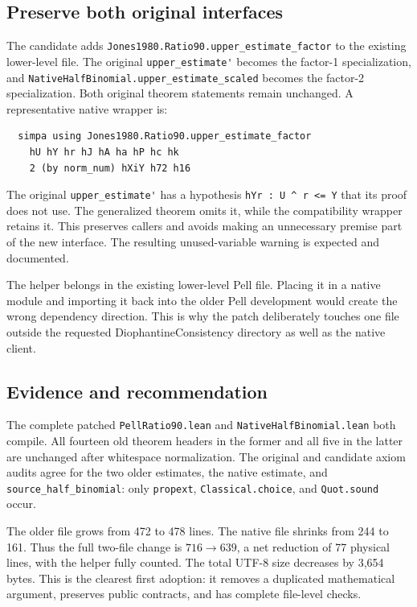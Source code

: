 \documentclass[11pt]{article}
\theoremstyle{remark}\newtheorem{remark}[proposition]{Remark}
\newcommand{\code}[1]{\nolinkurl{#1}}
\begin{document}
\subsection{Preserve both original interfaces}

The candidate adds \code{Jones1980.Ratio90.upper_estimate_factor} to the existing lower-level file. The original \code{upper_estimate'} becomes the factor-1 specialization, and \code{NativeHalfBinomial.upper_estimate_scaled} becomes the factor-2 specialization. Both original theorem statements remain unchanged. A representative native wrapper is:

\begin{lstlisting}
  simpa using Jones1980.Ratio90.upper_estimate_factor
    hU hY hr hJ hA ha hP hc hk
    2 (by norm_num) hXiY h72 h16
\end{lstlisting}

The original \code{upper_estimate'} has a hypothesis \code{hYr : U ^ r <= Y} that its proof does not use. The generalized theorem omits it, while the compatibility wrapper retains it. This preserves callers and avoids making an unnecessary premise part of the new interface. The resulting unused-variable warning is expected and documented.

The helper belongs in the existing lower-level Pell file. Placing it in a native module and importing it back into the older Pell development would create the wrong dependency direction. This is why the patch deliberately touches one file outside the requested DiophantineConsistency directory as well as the native client.

\subsection{Evidence and recommendation}

The complete patched \code{PellRatio90.lean} and \code{NativeHalfBinomial.lean} both compile. All fourteen old theorem headers in the former and all five in the latter are unchanged after whitespace normalization. The original and candidate axiom audits agree for the two older estimates, the native estimate, and \code{source_half_binomial}: only \code{propext}, \code{Classical.choice}, and \code{Quot.sound} occur.

The older file grows from 472 to 478 lines. The native file shrinks from 244 to 161. Thus the full two-file change is \(716\to639\), a net reduction of 77 physical lines, with the helper fully counted. The total UTF-8 size decreases by 3,654 bytes. This is the clearest first adoption: it removes a duplicated mathematical argument, preserves public contracts, and has complete file-level checks.
\end{document}
